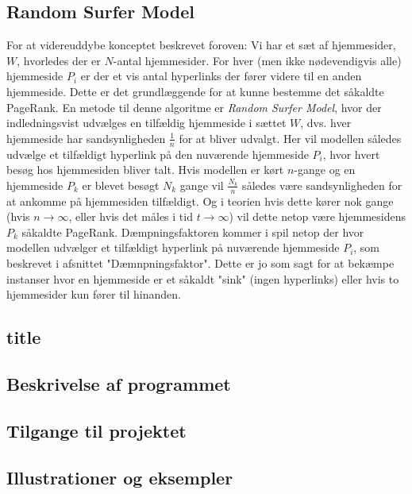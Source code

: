 \subsection*{Random Surfer Model}
For at videreuddybe konceptet beskrevet foroven: Vi har et sæt af hjemmesider, $W$, hvorledes der er $N$-antal hjemmesider. For hver (men ikke nødevendigvis alle) hjemmeside $P_i$ er der et vis antal hyperlinks der fører videre til en anden hjemmeside. Dette er det grundlæggende for at kunne bestemme det såkaldte PageRank. En metode til denne algoritme er \emph{Random Surfer Model}, hvor der indledningsvist udvælges en tilfældig hjemmeside i sættet $W$, dvs. hver hjemmeside har sandsynligheden $\frac{1}{n}$ for at bliver udvalgt. Her vil modellen således udvælge et tilfældigt hyperlink på den nuværende hjemmeside $P_i$, hvor hvert besøg hos hjemmesiden bliver talt. Hvis modellen er kørt $n$-gange og en hjemmeside $P_k$ er blevet besøgt $N_k$ gange vil $\frac{N_k}{n}$ således være sandsynligheden for at ankomme på hjemmesiden tilfældigt. Og i teorien hvis dette kører nok gange (hvis $n \rightarrow \infty$, eller hvis det måles i tid $t \rightarrow \infty$) vil dette netop være hjemmesidens $P_k$ såkaldte PageRank. Dæmpningsfaktoren kommer i spil netop der hvor modellen udvælger et tilfældigt hyperlink på nuværende hjemmeside $P_i$, som beskrevet i afsnittet "Dæmnpningsfaktor". Dette er jo som sagt for at bekæmpe instanser hvor en hjemmeside er et såkaldt "sink" (ingen hyperlinks) eller hvis to hjemmesider kun fører til hinanden.


\subsection*{title}

\subsection*{Beskrivelse af programmet}

\subsection*{Tilgange til projektet}

\subsection*{Illustrationer og eksempler}